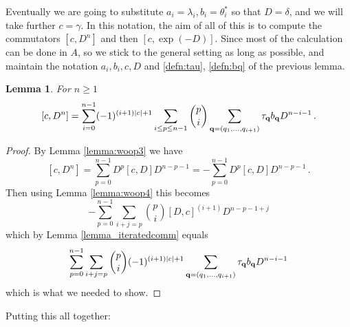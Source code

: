 \documentclass[english,letter paper,12pt,leqno]{article}
\newtheorem{lemma}[theorem]{Lemma}
\theoremstyle{example}
\numberwithin{equation}{section}
\def\be{\begin{equation}}
\def\ee{\end{equation}}
\begin{document}
Eventually we are going to substitute $a_i = \lambda_i, b_i = \theta_i^*$ so that $D = \delta$, and we will take further $c = \gamma$. In this notation, the aim of all of this is to compute the commutators $[c, D^n]$ and then $[c, \exp(-D)]$. Since most of the calculation can be done in $A$, so we stick to the general setting as long as possible, and maintain the notation $a_i, b_i, c, D$ and \eqref{defn:tau}, \eqref{defn:bq} of the previous lemma.


\begin{lemma}\label{lemma:commutator_wha} For $n \ge 1$
\[
[ c, D^n ] = \sum_{i=0}^{n-1} (-1)^{(i+1)|c| + 1} \sum_{i \le p \le n-1} \binom{p}{i} \sum_{\bold{q} = (q_1,\ldots,q_{i+1})} \tau_{\bold{q}} b_{\bold{q}} D^{n-i-1}\,.
\]
\end{lemma}
\begin{proof} 
By Lemma \ref{lemma:woop3} we have
\begin{equation}\label{eq:catfish}
[ c, D^n ] = \sum_{p=0}^{n-1} D^p [ c, D ] D^{n-p-1} = -\sum_{p=0}^{n-1} D^p [ c, D ] D^{n-p-1}\,.
\end{equation}
Then using Lemma \ref{lemma:woop4} this becomes
\be
-\sum_{p=0}^{n-1} \sum_{i+j=p} \binom{p}{i} [D, c]^{(i+1)} D^{n-p-1+j}
\ee
which by Lemma \ref{lemma_iteratedcomm} equals
\be
\sum_{p=0}^{n-1} \sum_{i+j=p} \binom{p}{i} (-1)^{(i+1)|c| + 1} \sum_{\bold{q} = (q_1,\ldots,q_{i+1})} \tau_{\bold{q}} b_{\bold{q}} D^{n-i-1}
\ee
which is what we needed to show.
\end{proof}

Putting this all together:
\end{document}
